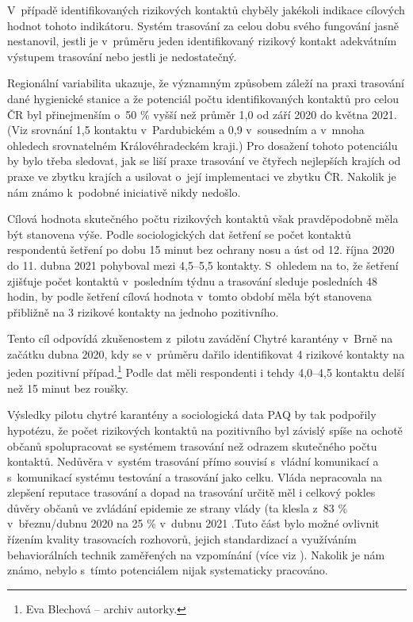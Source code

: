 V~případě identifikovaných rizikových kontaktů chyběly jakékoli indikace cílových hodnot tohoto indikátoru. Systém trasování za celou dobu svého fungování jasně nestanovil, jestli je v~průměru jeden identifikovaný rizikový kontakt adekvátním výstupem trasování nebo jestli je nedostatečný.

Regionální variabilita ukazuje, že významným způsobem záleží na praxi trasování dané hygienické stanice a že potenciál počtu identifikovaných kontaktů pro celou ČR byl přinejmenším o~50 \% vyšší než průměr 1,0 od září 2020 do května 2021. (Viz srovnání 1,5 kontaktu v~Pardubickém a 0,9 v~sousedním a v~mnoha ohledech srovnatelném Královéhradeckém kraji.) Pro dosažení tohoto potenciálu by bylo třeba sledovat, jak se liší praxe trasování ve čtyřech nejlepších krajích od praxe ve zbytku krajích a usilovat o~její implementaci ve zbytku ČR. Nakolik je nám známo k~podobné iniciativě nikdy nedošlo.

Cílová hodnota skutečného počtu rizikových kontaktů však pravděpodobně měla být stanovena výše. Podle sociologických dat šetření  \cite{tr_PAQ01} se počet kontaktů respondentů šetření po dobu 15 minut bez ochrany nosu a úst od 12. října 2020 do 11. dubna 2021 pohyboval mezi 4,5--5,5 kontakty. S~ohledem na to, že šetření zjišťuje počet kontaktů v~posledním týdnu a trasování sleduje posledních 48 hodin, by podle šetření cílová hodnota v~tomto období měla být stanovena přibližně na 3 rizikové kontakty na jednoho pozitivního.

Tento cíl odpovídá zkušenostem z~pilotu zavádění Chytré karantény v~Brně na začátku dubna 2020, kdy se v~průměru dařilo identifikovat 4 rizikové kontakty na jeden pozitivní případ.\footnote{Eva Blechová -- archiv autorky.} Podle dat \cite{tr_PAQ01} měli respondenti i tehdy 4,0--4,5 kontaktu delší než 15 minut bez roušky.

Výsledky pilotu chytré karantény a sociologická data PAQ by tak podpořily hypotézu, že počet rizikových kontaktů na pozitivního byl závislý spíše na ochotě občanů spolupracovat se systémem trasování než odrazem skutečného počtu kontaktů. Ne\-dů\-věra v~systém trasování přímo souvisí s~vládní komunikací a s~komunikací systému testování a trasování jako celku. Vláda nepracovala na zlepšení reputace trasování \cite{tr_bisop01} a dopad na trasování určitě měl i celkový pokles důvěry občanů ve zvládání epidemie ze strany vlády (ta klesla z~83 \% v~březnu/dubnu 2020 na 25 \% v~dubnu 2021 \cite{tr_STEM}.Tuto část bylo možné ovlivnit řízením kvality trasovacích rozhovorů, jejich standardizací a využíváním behaviorálních technik zaměřených na vzpomínání (více viz \cite{tr_bisop06}). Nakolik je nám známo, nebylo s~tímto potenciálem nijak systematicky pracováno.


